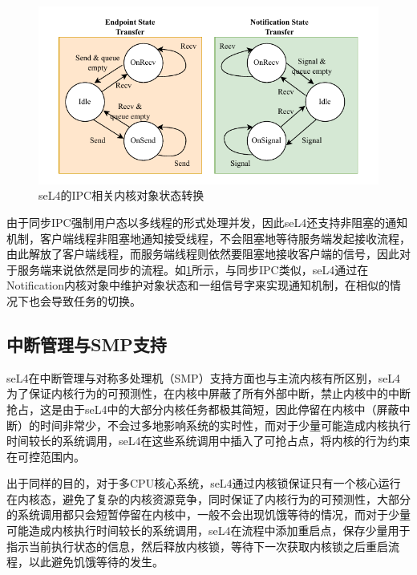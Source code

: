 \begin{figure}[htbp]
  \centering
  \includegraphics{figures/seL4_ipc_state.drawio.pdf}
  \caption{seL4的IPC相关内核对象状态转换}\label{fig:seL4_ipc_state}
\end{figure}

由于同步IPC强制用户态以多线程的形式处理并发，因此seL4还支持非阻塞的通知机制，客户端线程非阻塞地通知接受线程，不会阻塞地等待服务端发起接收流程，由此解放了客户端线程，而服务端线程则依然要阻塞地接收客户端的信号，因此对于服务端来说依然是同步的流程。如\ref{fig:seL4_ipc_state}所示，与同步IPC类似，seL4通过在Notification内核对象中维护对象状态和一组信号字来实现通知机制，在相似的情况下也会导致任务的切换。

\subsection{中断管理与SMP支持}
seL4在中断管理与对称多处理机（SMP）支持方面也与主流内核有所区别，seL4为了保证内核行为的可预测性，在内核中屏蔽了所有外部中断，禁止内核中的中断抢占，这是由于seL4中的大部分内核任务都极其简短，因此停留在内核中（屏蔽中断）的时间非常少，不会过多地影响系统的实时性，而对于少量可能造成内核执行时间较长的系统调用，seL4在这些系统调用中插入了可抢占点，将内核的行为约束在可控范围内。

出于同样的目的，对于多CPU核心系统，seL4通过内核锁保证只有一个核心运行在内核态，避免了复杂的内核资源竞争，同时保证了内核行为的可预测性，大部分的系统调用都只会短暂停留在内核中，一般不会出现饥饿等待的情况，而对于少量可能造成内核执行时间较长的系统调用，seL4在流程中添加重启点，保存少量用于指示当前执行状态的信息，然后释放内核锁，等待下一次获取内核锁之后重启流程，以此避免饥饿等待的发生。


